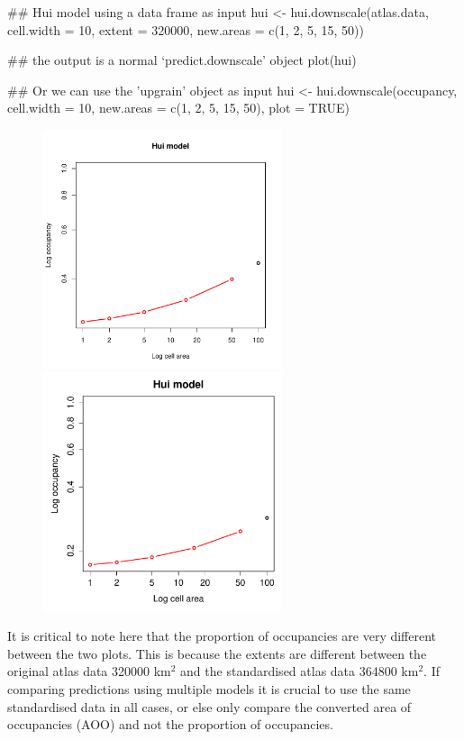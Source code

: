 \documentclass{article}[12pt, a4paper]
\begin{document}
\begin{Schunk}
\begin{Sinput}
## Hui model using a data frame as input
hui <- hui.downscale(atlas.data,
                     cell.width = 10,
                     extent = 320000,
                     new.areas = c(1, 2, 5, 15, 50))

## the output is a normal ‘predict.downscale’ object	
plot(hui)

## Or we can use the 'upgrain' object as input
hui <- hui.downscale(occupancy,
                     cell.width = 10,
                     new.areas = c(1, 2, 5, 15, 50),
                     plot = TRUE)
\end{Sinput}
\end{Schunk}
\begin{figure}[!ht]
\centering
\includegraphics[width=7cm]{Downscaling-downscale18}
\includegraphics[width=7cm]{Downscaling-downscale19}
\end{figure}

It is critical to note here that the proportion of occupancies are very different between the two plots. This is because the extents are different between the original atlas data 320000 km$^2$ and the standardised atlas data 364800 km$^2$. If comparing predictions using multiple models it is crucial to use the same standardised data in all cases, or else only compare the converted area of occupancies (AOO) and not the proportion of occupancies.
\end{document}
